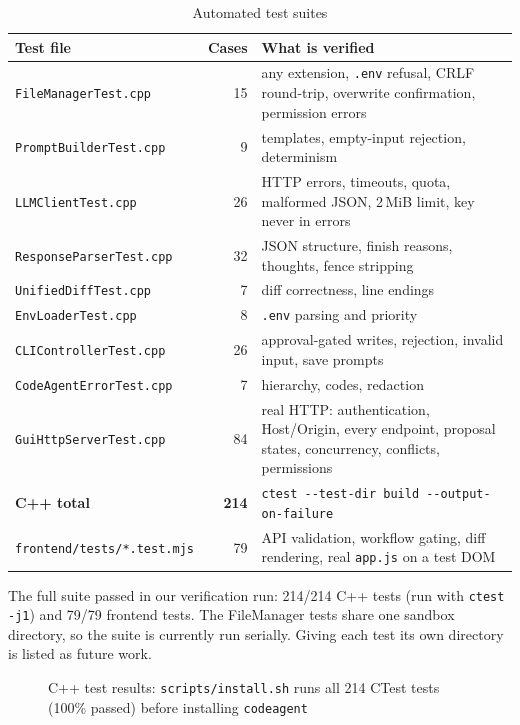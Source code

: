 \documentclass[12pt,a4paper,oneside]{book}
\begin{document}
\begin{table}[htbp]
\centering\small
\begin{tabular}{|p{4.7cm}|r|p{7.6cm}|}
\hline
\textbf{Test file} & \textbf{Cases} & \textbf{What is verified} \\ \hline
\texttt{FileManagerTest.cpp} & 15 & any extension, \texttt{.env} refusal, CRLF round-trip, overwrite confirmation, permission errors \\ \hline
\texttt{PromptBuilderTest.cpp} & 9 & templates, empty-input rejection, determinism \\ \hline
\texttt{LLMClientTest.cpp} & 26 & HTTP errors, timeouts, quota, malformed JSON, 2\,MiB limit, key never in errors \\ \hline
\texttt{ResponseParserTest.cpp} & 32 & JSON structure, finish reasons, thoughts, fence stripping \\ \hline
\texttt{UnifiedDiffTest.cpp} & 7 & diff correctness, line endings \\ \hline
\texttt{EnvLoaderTest.cpp} & 8 & \texttt{.env} parsing and priority \\ \hline
\texttt{CLIControllerTest.cpp} & 26 & approval-gated writes, rejection, invalid input, save prompts \\ \hline
\texttt{CodeAgentErrorTest.cpp} & 7 & hierarchy, codes, redaction \\ \hline
\texttt{GuiHttpServerTest.cpp} & 84 & real HTTP: authentication, Host/Origin, every endpoint, proposal states, concurrency, conflicts, permissions \\ \hline
\textbf{C++ total} & \textbf{214} & \texttt{ctest -{}-test-dir build -{}-output-on-failure} \\ \hline
\texttt{frontend/\allowbreak{}tests/\allowbreak{}*.test.mjs} & 79 & API validation, workflow gating, diff rendering, real \texttt{app.js} on a test DOM \\ \hline
\end{tabular}
\caption{Automated test suites}
\label{tab:ca-tests}
\end{table}

The full suite passed in our verification run: 214/214 C++ tests (run with
\texttt{ctest -j1}) and 79/79 frontend tests. The FileManager tests share one
sandbox directory, so the suite is currently run serially. Giving each test
its own directory is listed as future work.

\begin{figure}[htbp]
\centering
{}
\caption{C++ test results: \texttt{scripts/\allowbreak{}install.sh} runs all 214 CTest tests (100\% passed) before installing \texttt{codeagent}}
\label{fig:ca-ctest}
\end{figure}
\end{document}
